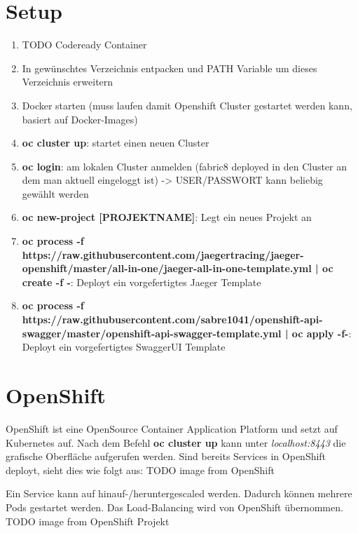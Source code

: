 \documentclass[11pt, a4paper, twoside]{article}   	%
\begin{document}
\section{Setup}
\begin{enumerate}
	\item TODO Codeready Container
	\item In gewünschtes Verzeichnis entpacken und PATH Variable um dieses Verzeichnis erweitern
	\item Docker starten (muss laufen damit Openshift Cluster gestartet werden kann, basiert auf Docker-Images)
	\item \textbf{oc cluster up}: startet einen neuen Cluster
	\item \textbf{oc login}: am lokalen Cluster anmelden (fabric8 deployed in den Cluster an dem man aktuell eingeloggt ist) -> USER/PASSWORT kann beliebig gewählt werden
	\item \textbf{oc new-project [PROJEKTNAME]}: Legt ein neues Projekt an
	\item \textbf{oc process -f https://raw.githubusercontent.com/jaegertracing/jaeger-openshift/master/all-in-one/jaeger-all-in-one-template.yml | oc create -f -}: Deployt ein vorgefertigtes Jaeger Template
	\item \textbf{oc process -f https://raw.githubusercontent.com/sabre1041/openshift-api-swagger/master/openshift-api-swagger-template.yml | oc apply -f-}: Deployt ein vorgefertigtes SwaggerUI Template
\end{enumerate}

\section{OpenShift}
OpenShift ist eine OpenSource Container Application Platform und setzt auf Kubernetes auf.
Nach dem Befehl \textbf{oc cluster up} kann unter \textit{localhost:8443} die grafische Oberfläche aufgerufen werden.
Sind bereits Services in OpenShift deployt, sieht dies wie folgt aus:
TODO image from OpenShift

Ein Service kann auf hinauf-/heruntergescaled werden. Dadurch können mehrere Pods gestartet werden. Das Load-Balancing wird von OpenShift übernommen.
TODO image from OpenShift Projekt
\end{document}
